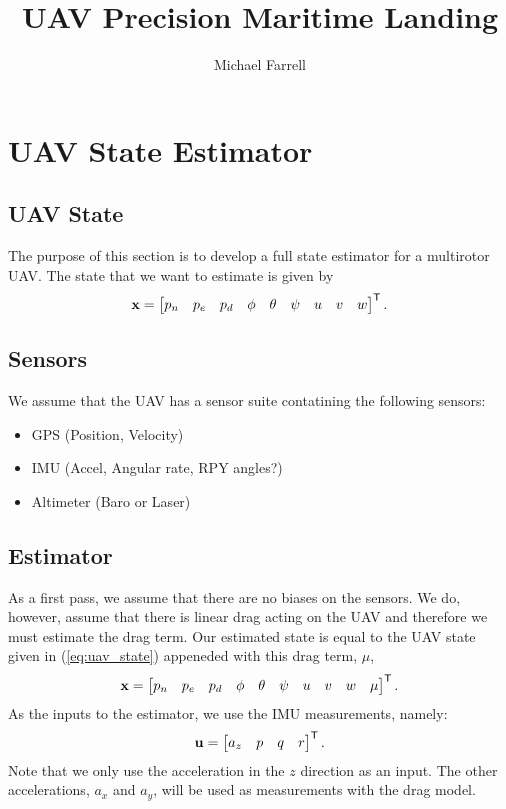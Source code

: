 \documentclass[a4paper]{article}
\title{\LARGE \bf UAV Precision Maritime Landing}
\author{Michael Farrell}
\begin{document}
\maketitle

\section{UAV State Estimator}
\subsection{UAV State}
The purpose of this section is to develop a full state estimator for a
multirotor UAV. The state that we want to estimate is given by
\begin{equation}
  \boldsymbol{\mathrm{x}} =
  \begin{bmatrix}
    p_n & p_e & p_d &
    \phi & \theta & \psi &
    u & v & w
  \end{bmatrix}^{\mathsf{T}}.
\label{eq:uav_state}
\end{equation}

\subsection{Sensors}
We assume that the UAV has a sensor suite contatining the following sensors:
\begin{itemize}
  \item GPS (Position, Velocity)
  \item IMU (Accel, Angular rate, RPY angles?)
  \item Altimeter (Baro or Laser)
\end{itemize}

\subsection{Estimator}
As a first pass, we assume that there are no biases on the sensors. We do,
however, assume that there is linear drag acting on the UAV and therefore
we must estimate the drag term. Our estimated state is equal to the UAV state
given in (\ref{eq:uav_state}) appeneded with this drag term, $\mu$,
\begin{equation}
  \boldsymbol{\mathrm{x}} =
  \begin{bmatrix}
    p_n & p_e & p_d &
    \phi & \theta & \psi &
    u & v & w &
    \mu
  \end{bmatrix}^{\mathsf{T}}.
\label{eq:est_state}
\end{equation}
As the inputs to the estimator, we use the IMU measurements, namely:
\begin{equation}
  \boldsymbol{\mathrm{u}} =
  \begin{bmatrix}
    a_z &
    p & q & r
  \end{bmatrix}^{\mathsf{T}}.
\label{eq:est_inputs}
\end{equation}
Note that we only use the acceleration in the $z$ direction as an input. The
other accelerations, $a_x$ and $a_y$, will be used as measurements with the drag
model.
\end{document}

